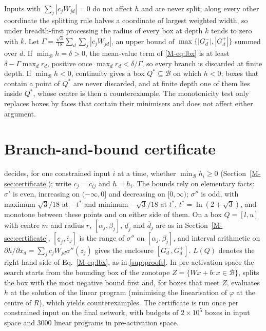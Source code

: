 \documentclass[11pt,a4paper]{article}
\newcommand{\B}{\mathcal{B}}
\newcommand{\sig}{\sigma}
\begin{document}
\paragraph{}
Inputs with $\sum_j|c_jW_{jd}|=0$ do not affect $h$ and are never split; along every other coordinate the splitting rule
halves a coordinate of largest weighted width, so under breadth-first processing the radius of every box at depth $k$
tends to zero with $k$. Let $\Gamma=\frac{\sqrt3}{18}\sum_d\sum_j|c_jW_{jd}|$, an upper bound of
$\max\{|G^-_d|,|G^+_d|\}$ summed over $d$. If $\min_\B h=\delta>0$, the mean-value term of \eqref{M-eq:lbx} is at least
$\delta-\Gamma\max_dr_d$, positive once $\max_dr_d<\delta/\Gamma$, so every branch is discarded at finite depth. If
$\min_\B h<0$, continuity gives a box $Q^\ast\subseteq\B$ on which $h<0$; boxes that contain a point of $Q^\ast$ are never
discarded, and at finite depth one of them lies inside $Q^\ast$, whose centre is then a counterexample. The monotonicity
test only replaces boxes by faces that contain their minimisers and does not affect either argument.

\section{Branch-and-bound certificate}\label{sup:bb}
 decides, for one constrained input $i$ at a time, whether $\min_\B h_i\ge0$ (Section~\ref{M-sec:certificate});
write $c_j=c_{ij}$ and $h=h_i$. The bounds rely on elementary facts: $\sig'$ is even, increasing on $(-\infty,0]$ and
decreasing on $[0,\infty)$; $\sig''$ is odd, with maximum $\sqrt3/18$ at $-t^\ast$ and minimum $-\sqrt3/18$ at $t^\ast$,
$t^\ast=\ln(2+\sqrt3)$, and monotone between these points and on either side of them. On a box $Q=[l,u]$ with centre $m$
and radius $r$, $[\alpha_j,\beta_j]$, $\underline d_j$ and $\overline d_j$ are as in Section~\ref{M-sec:certificate},
$[\underline e_j,\overline e_j]$ is the range of $\sig''$ on $[\alpha_j,\beta_j]$, and interval arithmetic on
$\partial h/\partial x_d=\sum_jc_jW_{jd}\sig''(z_j)$ gives the enclosure $[G^-_d,G^+_d]$. $L(Q)$ denotes the right-hand
side of Eq.~\eqref{M-eq:lbx}, as in \cref{sup:proofs}. In pre-activation space the search starts from the bounding box of the zonotope
$Z=\{Wx+b:x\in\B\}$, splits the box with the most negative bound first and, for boxes that meet $Z$, evaluates $h$ at the
solution of the linear program (minimising the linearisation of $\varphi$ at the centre of $R$), which yields
counterexamples. The certificate is run once per constrained input on the final network, with budgets of
$2\times10^5$ boxes in input space and 3000 linear programs in pre-activation space.
\end{document}
